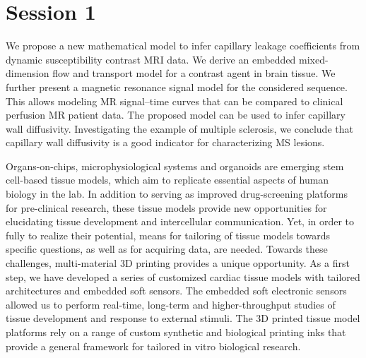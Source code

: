 \documentclass{article}
\begin{document}
\section*{Session 1}
\vspace{10pt}
{We propose a new mathematical model to infer capillary leakage coefficients from dynamic susceptibility contrast MRI data. We derive an embedded mixed-dimension flow and transport model for a contrast agent in brain tissue. We further present a magnetic resonance signal model for the considered sequence. This allows modeling MR signal–time curves that can be compared to clinical perfusion MR patient data. The proposed model can be used to infer capillary wall diffusivity. Investigating the example of multiple sclerosis, we conclude that capillary wall diffusivity is a good indicator for characterizing MS lesions.}


{Organs-on-chips, microphysiological systems and organoids are emerging stem cell-based tissue models, which aim to replicate essential aspects of human biology in the lab. In addition to serving as improved drug-screening platforms for pre-clinical research, these tissue models provide new opportunities for elucidating tissue development and intercellular communication. Yet, in order to fully to realize their potential, means for tailoring of tissue models towards specific questions, as well as for acquiring data, are needed. Towards these challenges, multi-material 3D printing provides a unique opportunity. As a first step, we have developed a series of customized cardiac tissue models with tailored architectures and embedded soft sensors. The embedded soft electronic sensors allowed us to perform real-time, long-term and higher-throughput studies of tissue development and response to external stimuli. The 3D printed tissue model platforms rely on a range of custom synthetic and biological printing inks that provide a general framework for tailored in vitro biological research. }
\end{document}
